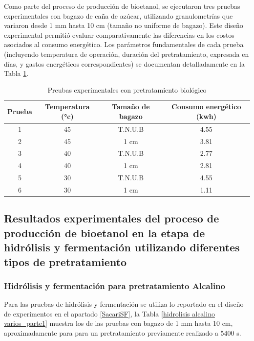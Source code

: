 \documentclass[12pt]{article}
\begin{document}
		Como parte del proceso de producción de bioetanol, se ejecutaron tres pruebas experimentales con bagazo de caña de azúcar, utilizando granulometrías que variaron desde 1 mm hasta 10 cm (tamaño no uniforme de bagazo). Este diseño experimental permitió evaluar comparativamente las diferencias en los costos asociados al consumo energético. Los parámetros fundamentales de cada prueba (incluyendo temperatura de operación, duración del pretratamiento, expresada en días, y gastos energéticos correspondientes) se documentan detalladamente en la Tabla \ref{Pretratamiento Biológico}.
		
	\begin{table}[H]
		\centering
		\caption{Preubas experimentales con pretratamiento biológico}
		\begin{tabular}{|c|c|c|c|}
			\hline
			Prueba & Temperatura (°c) & Tamaño de bagazo & Consumo energético (kwh) \\ \hline
			1 & 45 & T.N.U.B & 4.55 \\ \hline
			2 & 45 & 1 cm & 3.81 \\ \hline
			3 & 40 & T.N.U.B & 2.77 \\ \hline
			4 & 40 & 1 cm & 2.81 \\ \hline
			5 & 30 & T.N.U.B & 4.55 \\ \hline
			6 & 30 & 1 cm & 1.11 \\ \hline
		\end{tabular}
		\label{Pretratamiento Biológico}
	\end{table}
		
	
	\subsection{Resultados experimentales del proceso de producción de bioetanol en la etapa de hidrólisis y fermentación utilizando diferentes tipos de pretratamiento}
	\subsubsection{ Hidrólisis y fermentación para pretratamiento Alcalino}
	
	Para las pruebas de hidrólisis y fermentación se utiliza lo reportado en el diseño de experimentos en el apartado \ref{SacariSF}, la Tabla \ref{hidrolisis alcalino varios_parte1} muestra los de las pruebas con bagazo de 1 mm hasta 10 cm, aproximadamente para para un pretratamiento previamente realizado a 5400 s.
	
\end{document}
